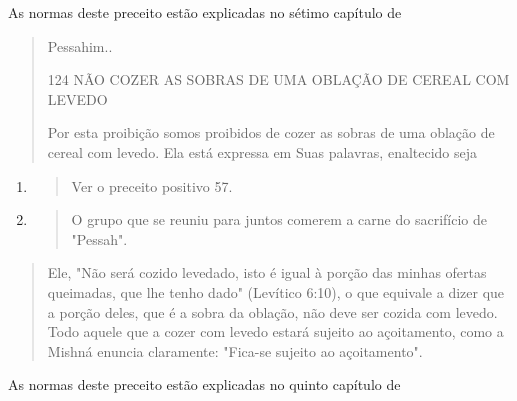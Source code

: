 As normas deste preceito estão explicadas no sétimo capítulo de

\begin{quote}
Pessahim..

124 NÃO COZER AS SOBRAS DE UMA OBLAÇÃO DE CEREAL COM LEVEDO

Por esta proibição somos proibidos de cozer as sobras de uma obla­ção de
cereal com levedo. Ela está expressa em Suas palavras, enaltecido seja
\end{quote}

\begin{enumerate}
\def\labelenumi{\arabic{enumi}.}
\setcounter{enumi}{291}
\item
  \begin{quote}
  Ver o preceito positivo 57.
  \end{quote}
\item
  \begin{quote}
  O grupo que se reuniu para juntos comerem a carne do sacrifício de
  "Pessah".
  \end{quote}
\end{enumerate}

\begin{quote}
Ele, "Não será cozido levedado, isto é igual à porção das minhas ofertas
quei­madas, que lhe tenho dado" (Levítico 6:10), o que equivale a dizer
que a por­ção deles, que é a sobra da oblação, não deve ser cozida com
levedo. Todo aquele que a cozer com levedo estará sujeito ao
açoitamento, como a Mishná enuncia claramente: "Fica-se sujeito ao
açoitamento".
\end{quote}

As normas deste preceito estão explicadas no quinto capítulo de

